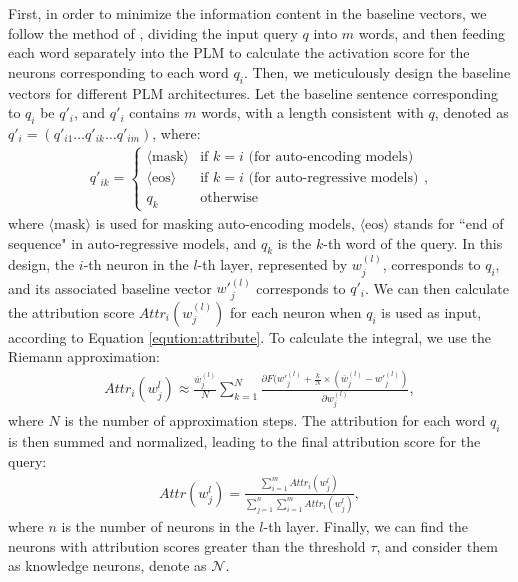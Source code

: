 \documentclass[]{article}
\begin{document}
First, in order to minimize the information content in the baseline vectors, we follow the method of \citeauthor{enguehard2023sequential}, dividing the input query $q$ into $m$ words, and then feeding each word separately into the PLM to calculate the activation score for the neurons corresponding to each word $q_i$.
Then, we meticulously design the baseline vectors for different PLM architectures. Let the baseline sentence corresponding to $q_i$ be $q'_i$, and $q'_i$ contains $m$ words, with a length consistent with $q$, denoted as $q'_i=(q'_{i1} \ldots q'_{ik} \ldots q'_{im})$, where:
{\small
\begin{align}
q'_{ik} =
\begin{cases}
\langle \text{mask}\rangle  & \text{if } k = i \text{ (for auto-encoding models)} \\
\langle \text{eos}\rangle  & \text{if } k = i \text{ (for auto-regressive models)} \\
q_k & \text{otherwise}
\end{cases},
\end{align}
}where $\langle \text{mask}\rangle$ is used for masking auto-encoding models, $\langle \text{eos}\rangle$ stands for ``end of sequence" in auto-regressive models, and $q_k$ is the $k$-th word of the query. In this design, the $i$-th neuron in the $l$-th layer, represented by $w_j^{(l)}$, corresponds to $q_i$,  and its associated baseline vector ${w'}^{(l)}_{j}$ corresponds to $q'_i$. We can then calculate the attribution score $Attr_i(w_j^{(l)})$ for each neuron when $q_i$ is used as input, according to Equation \eqref{eqution:attribute}.
To calculate the integral, we use the Riemann approximation:
{\small
\begin{align}
{Attr_i(w_j^l)} \approx \frac{\overline{w}^{(l)}_{j}}{N} \sum_{k=1}^{N} \frac{ \partial F({w'}^{(l)}_{j} + \frac{k}{N} \times (\overline{w}^{(l)}_{j} - {w'}^{(l)}_{j})}{\partial {w}^{(l)}_{j}},
\end{align}}where $N$ is the number of approximation steps. The attribution for each word $q_i$ is then summed and normalized, leading to the final attribution score for the query:
{\small \begin{align}
Attr(w_j^l) = \frac{\sum_{i=1}^{m} Attr_i(w_j^l)}{\sum_{j=1}^{n} \sum_{i=1}^{m} Attr_i(w_j^l)},
\end{align}}where $n$ is the number of neurons in the $l$-th layer. Finally, we can find the neurons with attribution scores greater than the threshold $\tau$, and consider them as knowledge neurons, denote as $\mathcal{N}$.
\end{document}
